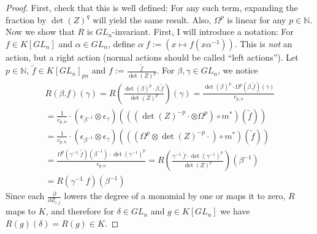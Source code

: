 \begin{proof}
  First, check that this is well defined:
  For any such term, expanding the fraction by $ \operatorname{det} (Z)^q $ will yield the same result.
  Also, $\Omega^p$ is linear for any $p \in \mathbb{N}$.
  Now we show that $R$ is $GL_n$-invariant.
  First, I will introduce a notation:
  For $f \in K \left\lbrack GL_n \right\rbrack $ and $\alpha \in GL_n$, define $ \alpha \dot{\phantom{.}} f := \left( x \mapsto f \left( x \alpha^{-1} \right) \right) $.
  This is \textit{not} an action, but a right action (normal actions should be called ``left actions'').
  Let $p \in \mathbb{N}$, $ \tilde{f} \in K \left\lbrack GL_n \right\rbrack_{pn} $ and $ f := \frac{\tilde{f}}{\operatorname{det}(Z)^p} $.
  For $ \beta , \gamma \in GL_n $, we notice
  \begin{equation}
    \begin{aligned}
      R \left( \beta . f \right) (\gamma)
      = R \left( \frac{ \operatorname{det} (\beta)^p \cdot \beta . \tilde{f}}{\operatorname{det} (Z)^p} \right) (\gamma)
      = \frac{ \operatorname{det} (\beta)^p \cdot \Omega^p \left( \beta . \tilde{f} \right) (\gamma) }{ c_{p,n} } \\
      = \frac{1}{c_{p,n}} \cdot \left( \epsilon_{\beta^{-1}} \otimes \epsilon_\gamma \right) \left( \left( \left( \operatorname{det}(Z)^{-p} \cdot \otimes \Omega^p \right) \circ m^\ast \right) \left( \tilde{f} \right) \right) \\
      = \frac{1}{c_{p,n}} \cdot \left( \epsilon_{\beta^{-1}} \otimes \epsilon_\gamma \right) \left( \left( \left( \Omega^p \otimes \operatorname{det}(Z)^{-p} \cdot \right) \circ m^\ast \right) \left( \tilde{f} \right) \right) \\
      = \frac{ \Omega^p \left( \gamma^{-1} \dot{\phantom{.}} \tilde{f} \right) (\beta^{-1}) \cdot \operatorname{det} \left (\gamma^{-1} \right)^p }{ c_{p,n} }
      = R \left( \frac{ \gamma^{-1} \dot{\phantom{.}} \tilde{f} \cdot \operatorname{det} \left( \gamma^{-1} \right)^p }{\operatorname{det} (Z)^p} \right) \left( \beta^{-1} \right) \\
      = R \left( \gamma^{-1} \dot{\phantom{.}} f \right) \left( \beta^{-1} \right)
    \end{aligned}
  \end{equation}
  Since each $ \frac {\partial}{ \partial Z_{i,j} } $ lowers the degree of a monomial by one or maps it to zero, $R$ maps to $K$, and therefore for $ \delta \in GL_n $ and $ g \in K \left\lbrack GL_n \right\rbrack $ we have $ R(g)(\delta) = R(g) \in K $.

\end{proof}
